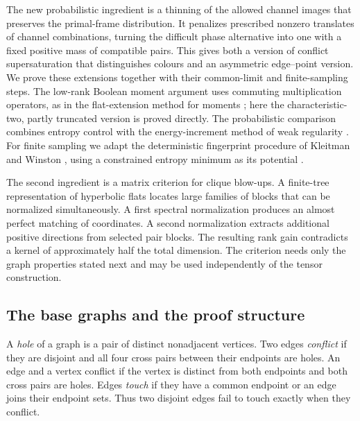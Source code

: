 The new probabilistic ingredient is a thinning of the allowed
channel images that preserves the primal-frame distribution. It
penalizes prescribed nonzero translates of channel combinations,
turning the difficult phase alternative into one with a fixed
positive mass of compatible pairs. This gives both a version of
conflict supersaturation that distinguishes colours and an
asymmetric edge--point version. We prove these extensions together
with their common-limit and finite-sampling steps. The low-rank Boolean
moment argument uses commuting multiplication operators, as in the
flat-extension method for moments \citep{laurentmourrain2009}; here the
characteristic-two, partly truncated version is proved directly. The
probabilistic comparison combines entropy control with the
energy-increment method of weak regularity \citep{cover2006,frieze1999}.
For finite sampling we adapt the deterministic fingerprint procedure of
Kleitman and Winston \citep{kleitmanwinston1982,samotij2015}, using a
constrained entropy minimum as its potential \citep{csiszar1975}.

The second ingredient is a matrix criterion for clique blow-ups.
A finite-tree representation of hyperbolic flats locates large
families of blocks that can be normalized simultaneously. A first
spectral normalization produces an almost perfect matching of
coordinates. A second normalization extracts additional positive
directions from selected pair blocks. The resulting rank gain
contradicts a kernel of approximately half the total dimension.
The criterion needs only the graph properties stated next and
may be used independently of the tensor construction.

\subsection{The base graphs and the proof structure}

A \emph{hole} of a graph is a pair of distinct nonadjacent vertices.
Two edges \emph{conflict} if they are disjoint and all four cross
pairs between their endpoints are holes. An edge and a vertex
conflict if the vertex is distinct from both endpoints and both
cross pairs are holes. Edges \emph{touch} if they have a common
endpoint or an edge joins their endpoint sets. Thus two disjoint
edges fail to touch exactly when they conflict.



